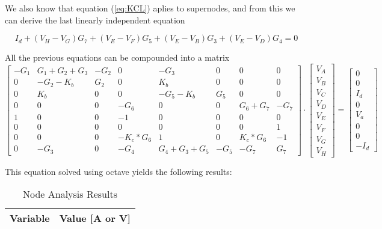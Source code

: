 We also know that equation (\ref{eq:KCL}) aplies to supernodes, and from this we can derive the last linearly independent equation



 \begin{equation}
  I_d+(V_H-V_G)G_7+(V_E-V_F)G_5+(V_E-V_B)G_3+(V_E-V_D)G_4=0
  \label{eq:supenodosI}
\end{equation}

All the previous equations can be compounded into a matrix
  \begin{equation}\label{eq:matrixeqn2}
\begin{bmatrix}
    -G_1 & G_1+G_2+G_3 & -G_2 & 0 & -G_3 & 0 & 0 & 0\\
    0 & -G_2-K_b & G_2 & 0 & K_b & 0 & 0 & 0\\
    0 & K_b & 0 & 0 & -G_5-K_b & G_5 & 0 & 0\\
    0 & 0 & 0 & -G_6 & 0 & 0 & G_6+G_7 & -G_7\\
    1 & 0 & 0 & -1 & 0 & 0 & 0 & 0\\
    0 & 0 & 0 & 0 & 0 & 0 & 0 & 1\\
    0 & 0 & 0 & -K_c*G_6 & 1 & 0 & K_c*G_6 & -1\\
    0 & -G_3 & 0 & -G_4 & G_4+G_3+G_5 & -G_5 & -G_7 & G_7
\end{bmatrix}
\cdot
\begin{bmatrix}
V_A \\
V_B \\
V_C \\
V_D \\
V_E \\
V_F \\
V_G \\
V_H 
    \end{bmatrix}
=
    \begin{bmatrix}
0 \\
0 \\
I_d \\
0\\
V_a \\
0 \\
0 \\
-I_d
    \end{bmatrix}
  \end{equation}

This equation solved using octave yields the following results:

  \begin{table}[H]
    \centering
    \begin{tabular}{|l|r|}
      \hline    
      {\bf Variable} & {\bf Value [A or V]} \\ \hline
      
    \end{tabular}
    \caption{Node Analysis Results}
    \label{tab:nodeA}
  \end{table}
